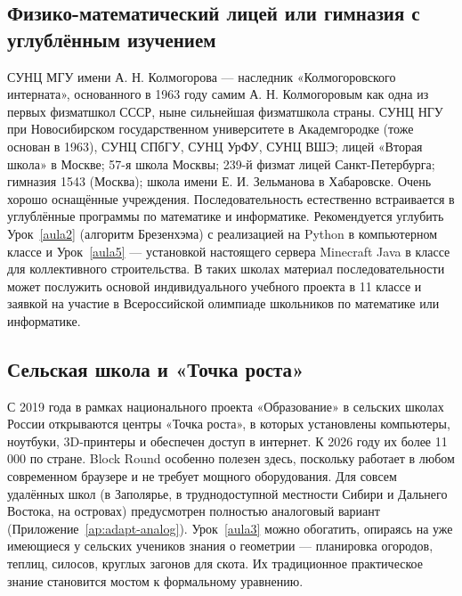 \documentclass[12pt,a4paper]{scrartcl}
\begin{document}
\subsection{Физико-математический лицей или гимназия с углублённым изучением}
СУНЦ МГУ имени А. Н. Колмогорова --- наследник «Колмогоровского интерната», основанного в 1963 году самим А. Н. Колмогоровым как одна из первых физматшкол СССР, ныне сильнейшая физматшкола страны. СУНЦ НГУ при Новосибирском государственном университете в Академгородке (тоже основан в 1963), СУНЦ СПбГУ, СУНЦ УрФУ, СУНЦ ВШЭ; лицей «Вторая школа» в Москве; 57-я школа Москвы; 239-й физмат лицей Санкт-Петербурга; гимназия 1543 (Москва); школа имени Е. И. Зельманова в Хабаровске. Очень хорошо оснащённые учреждения. Последовательность естественно встраивается в углублённые программы по математике и информатике. Рекомендуется углубить Урок~\ref{aula2} (алгоритм Брезенхэма) с реализацией на Python в компьютерном классе и Урок~\ref{aula5} --- установкой настоящего сервера Minecraft Java в классе для коллективного строительства. В таких школах материал последовательности может послужить основой индивидуального учебного проекта в 11 классе и заявкой на участие в Всероссийской олимпиаде школьников по математике или информатике.

\subsection{Сельская школа и «Точка роста»}
С 2019 года в рамках национального проекта «Образование» в сельских школах России открываются центры «Точка роста», в которых установлены компьютеры, ноутбуки, 3D-принтеры и обеспечен доступ в интернет. К 2026 году их более 11\,000 по стране. Block Round особенно полезен здесь, поскольку работает в любом современном браузере и не требует мощного оборудования. Для совсем удалённых школ (в Заполярье, в труднодоступной местности Сибири и Дальнего Востока, на островах) предусмотрен полностью аналоговый вариант (Приложение~\ref{ap:adapt-analog}). Урок~\ref{aula3} можно обогатить, опираясь на уже имеющиеся у сельских учеников знания о геометрии --- планировка огородов, теплиц, силосов, круглых загонов для скота. Их традиционное практическое знание становится мостом к формальному уравнению.
\end{document}
